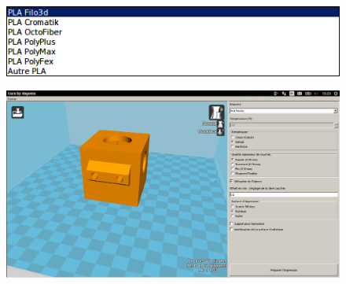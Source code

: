 \documentclass{article}
\begin{document}
\begin{figure}[h!]
\centering
\includegraphics[scale=0.6]{./images/cura6.png}
\end{figure}\hfill 
\newpage
\begin{figure}[h!]
\centering
\includegraphics[scale=0.3]{./images/cura7.png}
\end{figure}\hfill 
\end{document}
